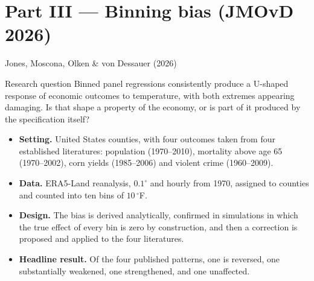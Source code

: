 \documentclass[aspectratio=169,10pt]{beamer}
\begin{document}
\section{Part III — Binning bias (JMOvD 2026)}

\begin{frame}{Jones, Moscona, Olken \& von Dessauer (2026)}
  \begin{block}{Research question}
    \small Binned panel regressions consistently produce a U-shaped response of
    economic outcomes to temperature, with both extremes appearing damaging. Is that
    shape a property of the economy, or is part of it produced by the specification
    itself?
  \end{block}
  \vspace{2pt}
  \small
  \begin{itemize}
    \item \textbf{Setting.} United States counties, with four outcomes taken from four
          established literatures: population (1970--2010), mortality above age 65
          (1970--2002), corn yields (1985--2006) and violent crime (1960--2009).
    \item \textbf{Data.} ERA5-Land reanalysis, $0.1^\circ$ and hourly from 1970,
          assigned to counties and counted into ten bins of $10\,^\circ$F.
    \item \textbf{Design.} The bias is derived analytically, confirmed in simulations
          in which the true effect of every bin is zero by construction, and then a
          correction is proposed and applied to the four literatures.
    \item \textbf{Headline result.} Of the four published patterns, one is reversed,
          one substantially weakened, one strengthened, and one unaffected.
  \end{itemize}
\end{frame}
\end{document}
